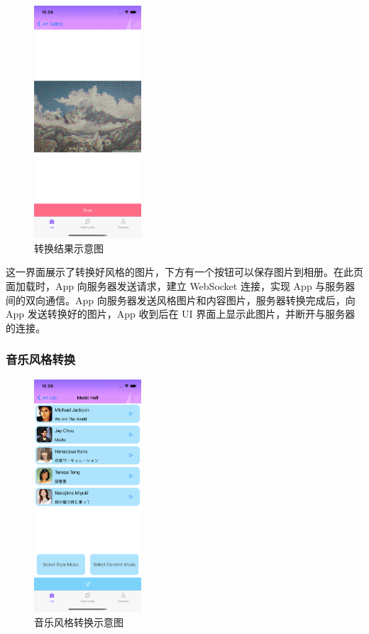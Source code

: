 \begin{figure}
\includegraphics[width=4cm]{figures/图片转换效果.png}
\caption{转换结果示意图}
\label{fig:my_label}
\end{figure}

这一界面展示了转换好风格的图片，下方有一个按钮可以保存图片到相册。在此页面加载时，App 向服务器发送请求，建立 WebSocket 连接，实现 App 与服务器间的双向通信。App 向服务器发送风格图片和内容图片，服务器转换完成后，向 App 发送转换好的图片，App 收到后在 UI 界面上显示此图片，并断开与服务器的连接。

\subsubsection{音乐风格转换}


\begin{figure}
\includegraphics[width=4cm]{figures/音乐风格转换.png}
\caption{音乐风格转换示意图}
\label{fig:my_label}
\end{figure}

